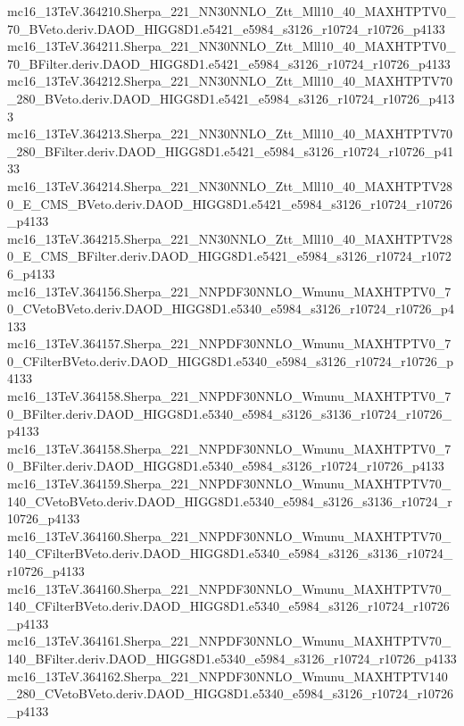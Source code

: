 mc16_13TeV.364210.Sherpa_221_NN30NNLO_Ztt_Mll10_40_MAXHTPTV0_70_BVeto.deriv.DAOD_HIGG8D1.e5421_e5984_s3126_r10724_r10726_p4133 \\
mc16_13TeV.364211.Sherpa_221_NN30NNLO_Ztt_Mll10_40_MAXHTPTV0_70_BFilter.deriv.DAOD_HIGG8D1.e5421_e5984_s3126_r10724_r10726_p4133 \\
mc16_13TeV.364212.Sherpa_221_NN30NNLO_Ztt_Mll10_40_MAXHTPTV70_280_BVeto.deriv.DAOD_HIGG8D1.e5421_e5984_s3126_r10724_r10726_p4133 \\
mc16_13TeV.364213.Sherpa_221_NN30NNLO_Ztt_Mll10_40_MAXHTPTV70_280_BFilter.deriv.DAOD_HIGG8D1.e5421_e5984_s3126_r10724_r10726_p4133 \\
mc16_13TeV.364214.Sherpa_221_NN30NNLO_Ztt_Mll10_40_MAXHTPTV280_E_CMS_BVeto.deriv.DAOD_HIGG8D1.e5421_e5984_s3126_r10724_r10726_p4133 \\
mc16_13TeV.364215.Sherpa_221_NN30NNLO_Ztt_Mll10_40_MAXHTPTV280_E_CMS_BFilter.deriv.DAOD_HIGG8D1.e5421_e5984_s3126_r10724_r10726_p4133 \\
mc16_13TeV.364156.Sherpa_221_NNPDF30NNLO_Wmunu_MAXHTPTV0_70_CVetoBVeto.deriv.DAOD_HIGG8D1.e5340_e5984_s3126_r10724_r10726_p4133 \\
mc16_13TeV.364157.Sherpa_221_NNPDF30NNLO_Wmunu_MAXHTPTV0_70_CFilterBVeto.deriv.DAOD_HIGG8D1.e5340_e5984_s3126_r10724_r10726_p4133 \\
mc16_13TeV.364158.Sherpa_221_NNPDF30NNLO_Wmunu_MAXHTPTV0_70_BFilter.deriv.DAOD_HIGG8D1.e5340_e5984_s3126_s3136_r10724_r10726_p4133 \\
mc16_13TeV.364158.Sherpa_221_NNPDF30NNLO_Wmunu_MAXHTPTV0_70_BFilter.deriv.DAOD_HIGG8D1.e5340_e5984_s3126_r10724_r10726_p4133 \\
mc16_13TeV.364159.Sherpa_221_NNPDF30NNLO_Wmunu_MAXHTPTV70_140_CVetoBVeto.deriv.DAOD_HIGG8D1.e5340_e5984_s3126_s3136_r10724_r10726_p4133 \\
mc16_13TeV.364160.Sherpa_221_NNPDF30NNLO_Wmunu_MAXHTPTV70_140_CFilterBVeto.deriv.DAOD_HIGG8D1.e5340_e5984_s3126_s3136_r10724_r10726_p4133 \\
mc16_13TeV.364160.Sherpa_221_NNPDF30NNLO_Wmunu_MAXHTPTV70_140_CFilterBVeto.deriv.DAOD_HIGG8D1.e5340_e5984_s3126_r10724_r10726_p4133 \\
mc16_13TeV.364161.Sherpa_221_NNPDF30NNLO_Wmunu_MAXHTPTV70_140_BFilter.deriv.DAOD_HIGG8D1.e5340_e5984_s3126_r10724_r10726_p4133 \\
mc16_13TeV.364162.Sherpa_221_NNPDF30NNLO_Wmunu_MAXHTPTV140_280_CVetoBVeto.deriv.DAOD_HIGG8D1.e5340_e5984_s3126_r10724_r10726_p4133 \\
